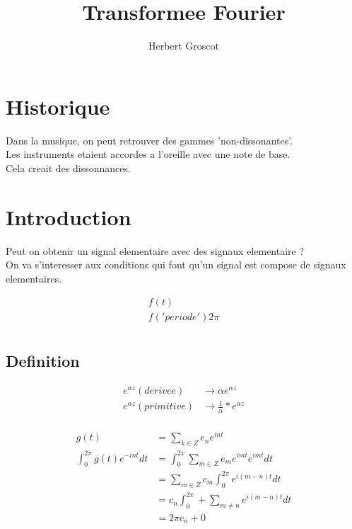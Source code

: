 \documentclass[a4paper,11pt]{article}
\title{Transformee Fourier}
\author{Herbert Groscot}
\begin{document}
\maketitle
\tableofcontents
\newpage

\section{Historique}

Dans la musique, on peut retrouver des gammes 'non-dissonantes'.\\
Les instruments etaient accordes a l'oreille avec une note de base.\\
Cela creait des dissonnances.\\

\section{Introduction}
Peut on obtenir un signal elementaire avec des signaux elementaire ?\\

On va s'interesser aux conditions qui font qu'un signal est compose de signaux elementaires.

\begin{align*}
f(t)  \\
        f   ('periode')  2\pi \\
\end{align*}

\subsection{Definition}

\begin{align*}
  e^{\alpha z}   (derivee) &\rightarrow \alpha e^{\alpha z}\\
  e^{\alpha z} (primitive) &\rightarrow \frac{1}{\alpha} * e^{\alpha z}\\
\end{align*}

\begin{align*}
  g(t) &= \sum_{k \in Z} e_{n}e^{int}\\
  \int_{0}^{2\pi} g(t)e^{-int} dt &= \int_{0}^{2x} \sum_{m \in Z} e_m e^{imt} e^{imt} dt \\
  &= \sum_{m \in Z} c_m \int_{0}^{2\pi} e^{i(m - n)t} dt\\
  &= c_n \int_{0}^{2\pi} + \sum_{m \neq n} e^{i(m-n)t} dt \\
  &= 2\pi c_n + 0
\end{align*}
\end{document}
